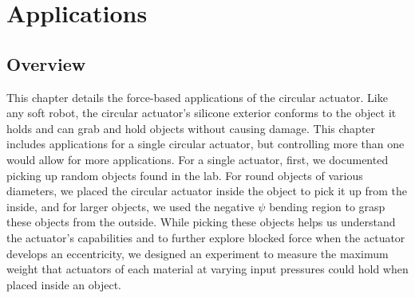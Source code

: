 \chapter{Applications}
\section*{Overview}
This chapter details the force-based applications of the circular actuator. Like any soft robot, the circular actuator's silicone exterior conforms to the object it holds and can grab and hold objects without causing damage. This chapter includes applications for a single circular actuator, but controlling more than one would allow for more applications. For a single actuator, first, we documented picking up random objects found in the lab. For round objects of various diameters, we placed the circular actuator inside the object to pick it up from the inside, and for larger objects, we used the negative $\psi$ bending region to grasp these objects from the outside. While picking these objects helps us understand the actuator's capabilities and to further explore blocked force when the actuator develops an eccentricity, we designed an experiment to measure the maximum weight that actuators of each material at varying input pressures could hold when placed inside an object.


